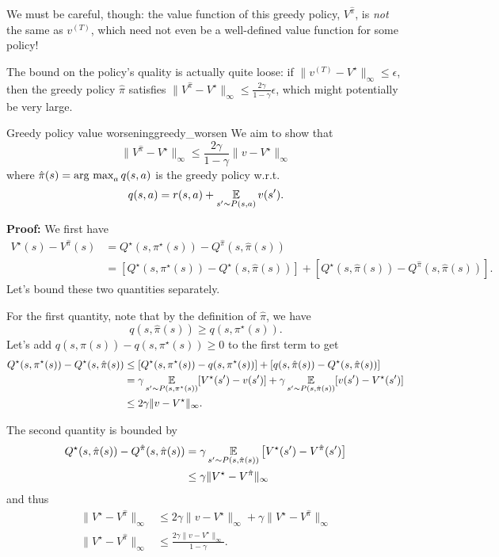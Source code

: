 \documentclass[../main/main]{subfiles}
\begin{document}
We must be careful, though: the value function of this greedy policy, $V^{\hat \pi}$, is \emph{not} the same as $v^{(T)}$, which need not even be a well-defined value function for some policy!

The bound on the policy's quality is actually quite loose: if $\|v^{(T)} - V^\star\|_{\infty} \le \epsilon$, then the greedy policy $\hat \pi$ satisfies $\|V^{\hat \pi} - V^\star\|_{\infty} \le \frac{2\gamma}{1-\gamma} \epsilon$, which might potentially be very large.

\begin{theorem}{Greedy policy value worsening}{greedy_worsen}
    We aim to show that
    \[
        \|V^{\hat \pi} - V^\star \|_{\infty} \le \frac{2 \gamma}{1-\gamma} \|v - V^\star\|_{\infty}
    \]
    where $\hat \pi(s) = \operatorname*{\textrm{arg\ max}}_a q(s, a)$ is the greedy policy w.r.t. \[ q(s, a) = r(s, a) + \operatorname*{\mathbb{E}}_{s' \sim P(s, a)} v(s'). \]

    \textbf{Proof:} We first have
    \begin{align*}
        V^{\star}(s) - V^{\hat \pi}(s) &= Q^{\star}(s,\pi^\star(s)) - Q^{\hat \pi}(s, \hat \pi(s))\\
        &= [Q^{\star}(s,\pi^\star(s)) - Q^{\star}(s, \hat \pi(s))] + [Q^{\star}(s, \hat \pi(s)) - Q^{\hat \pi}(s, \hat \pi(s))].
    \end{align*}
    Let's bound these two quantities separately.

    For the first quantity, note that by the definition of $\hat \pi$, we have
    \[ q(s, \hat \pi(s)) \ge q(s,\pi^\star(s)). \]
    Let's add $q(s, \hat \pi(s)) - q(s,\pi^\star(s)) \ge 0$ to the first term to get
    \begin{align*}
        Q^{\star}(s,\pi^\star(s)) - Q^{\star}(s, \hat \pi(s)) &\le [Q^{\star}(s,\pi^\star(s))- q(s,\pi^\star(s))] + [q(s, \hat \pi(s)) - Q^{\star}(s, \hat \pi(s))] \\
        &= \gamma \operatorname*{\mathbb{E}}_{s' \sim P(s, \pi^{\star}(s))} [ V^{\star}(s') - v(s') ] + \gamma \operatorname*{\mathbb{E}}_{s' \sim P(s, \hat \pi(s))} [ v(s') - V^{\star}(s') ] \\
        &\le 2 \gamma \|v - V^{\star}\|_{\infty}.
    \end{align*}

    The second quantity is bounded by
    \begin{align*}
        Q^{\star}(s, \hat \pi(s)) - Q^{\hat \pi}(s, \hat \pi(s))
        &=
        \gamma \operatorname*{\mathbb{E}}_{s'\sim P(s, \hat \pi(s))}\left[ V^\star(s') - V^{\hat \pi}(s') \right] \\
        & \leq 
        \gamma \|V^{\star} - V^{\hat \pi}\|_\infty
    \end{align*}
    and thus
    \begin{align*}
        \|V^\star - V^{\hat \pi}\|_\infty &\le 2 \gamma \|v - V^{\star}\|_{\infty} + \gamma \|V^{\star} - V^{\hat \pi}\|_\infty \\
        \|V^\star - V^{\hat \pi}\|_\infty &\le \frac{2 \gamma \|v - V^{\star}\|_{\infty}}{1-\gamma}.
    \end{align*}
\end{theorem}
\end{document}
